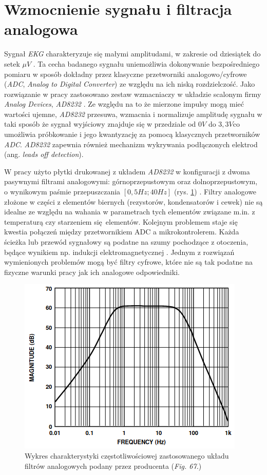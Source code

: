 \newpage

\section{Wzmocnienie sygnału i filtracja analogowa}

Sygnał \textit{EKG} charakteryzuje się małymi amplitudami, w zakresie od dziesiątek do setek $\mu V$ \cite{Zywietz1990}.
Ta cecha badanego sygnału uniemożliwia dokonywanie bezpośredniego pomiaru w sposób dokładny przez klasyczne przetworniki analogowo/cyfrowe (\textit{ADC}, \textit{Analog to Digital Converter})
ze względu na ich niską rozdzielczość. Jako rozwiązanie w pracy zastosowano zestaw wzmacniaczy w układzie scalonym firmy \textit{Analog Devices}, \textit{AD8232} \cite{AD8232ds}. 
Ze względu na to że mierzone impulsy mogą mieć wartości ujemne, \textit{AD8232} przesuwa, wzmacnia i normalizuje amplitudę sygnału w taki sposób że sygnał wyjściowy znajduje się w przedziale od $0V$ do $3,3V$co umożliwia próbkowanie i jego kwantyzację za pomocą klasycznych przetworników \textit{ADC}. 
\textit{AD8232} zapewnia również mechanizm wykrywania podłączonych elektrod (ang. \textit{leads off detection}).


W pracy użyto płytki drukowanej z układem \textit{AD8232} \cite{AD8232BS} w konfiguracji z dwoma pasywnymi filtrami analogowymi: 
górnoprzepustowym oraz dolnoprzepustowym, o wynikowym paśmie przepuszczania $[0,5 Hz; 40Hz]$ (rys. \ref{fig:afilt}) \cite{AD8232ds}.
Filtry analogowe złożone w części z elementów biernych (rezystorów, kondensatorów i cewek) nie są idealne ze względu na wahania w 
parametrach tych elementów związane m.in. z temperaturą czy starzeniem się elementów. Kolejnym problemem staje się kwestia połączeń
między przetwornikiem ADC a mikrokontrolerem. Każda ścieżka lub przewód sygnałowy są podatne na szumy pochodzące z otoczenia, będące
wynikiem np. indukcji elektromagnetycznej \cite{EmcPhy2010}. Jednym z rozwiązań wymienionych problemów mogą być 
filtry cyfrowe, które nie są tak podatne na fizyczne warunki pracy jak ich analogowe odpowiedniki.

\begin{figure}[h!]
    \centering 
    \includegraphics[scale=0.75]{pl/media/afilt.png}
    \caption{Wykres charakterystyki częstotliwościowej zastosowanego układu filtrów analogowych podany przez producenta \cite{AD8232ds}(\textit{Fig. 67.})}
    \label{fig:afilt}
\end{figure}

